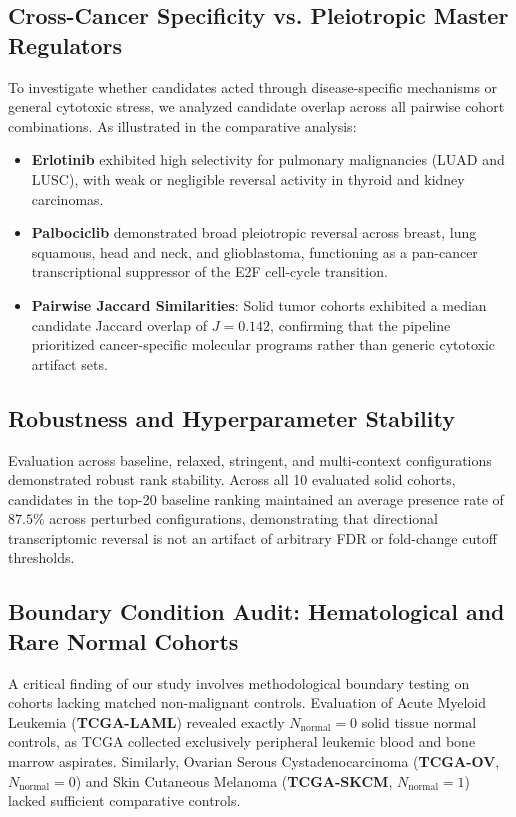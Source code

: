 \documentclass[10pt,journal,compsoc,twocolumn]{IEEEtran}
\begin{document}
\subsection{Cross-Cancer Specificity vs. Pleiotropic Master Regulators}
To investigate whether candidates acted through disease-specific mechanisms or general cytotoxic stress, we analyzed candidate overlap across all pairwise cohort combinations. As illustrated in the comparative analysis:
\begin{itemize}
    \item \textbf{Erlotinib} exhibited high selectivity for pulmonary malignancies (LUAD and LUSC), with weak or negligible reversal activity in thyroid and kidney carcinomas.
    \item \textbf{Palbociclib} demonstrated broad pleiotropic reversal across breast, lung squamous, head and neck, and glioblastoma, functioning as a pan-cancer transcriptional suppressor of the E2F cell-cycle transition.
    \item \textbf{Pairwise Jaccard Similarities}: Solid tumor cohorts exhibited a median candidate Jaccard overlap of $J = 0.142$, confirming that the pipeline prioritized cancer-specific molecular programs rather than generic cytotoxic artifact sets.
\end{itemize}

\subsection{Robustness and Hyperparameter Stability}
Evaluation across baseline, relaxed, stringent, and multi-context configurations demonstrated robust rank stability. Across all 10 evaluated solid cohorts, candidates in the top-20 baseline ranking maintained an average presence rate of $87.5\%$ across perturbed configurations, demonstrating that directional transcriptomic reversal is not an artifact of arbitrary FDR or fold-change cutoff thresholds.

\subsection{Boundary Condition Audit: Hematological and Rare Normal Cohorts}
A critical finding of our study involves methodological boundary testing on cohorts lacking matched non-malignant controls. Evaluation of Acute Myeloid Leukemia (\textbf{TCGA-LAML}) revealed exactly $N_{\text{normal}} = 0$ solid tissue normal controls, as TCGA collected exclusively peripheral leukemic blood and bone marrow aspirates. Similarly, Ovarian Serous Cystadenocarcinoma (\textbf{TCGA-OV}, $N_{\text{normal}} = 0$) and Skin Cutaneous Melanoma (\textbf{TCGA-SKCM}, $N_{\text{normal}} = 1$) lacked sufficient comparative controls.
\end{document}
